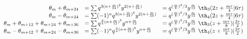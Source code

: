 \begin{equation}
  \begin{array}{rll}
\theta_m + \theta_{m+24} &= \sum q^{3(n+{m\over 24})^2} y^{2(n+{m\over 24})} 
   &= q^{({m\over 8})^2/3} y^{m\over 12} ~\th_3(2z+{m\tau\over 4}|6\tau) \\
\theta_m - \theta_{m+24} &= \sum (-1)^n q^{3(n+{m\over 24})^2} y^{2(n+{m\over 24})} 
   &= q^{({m\over 8})^2/3} y^{m\over 12} ~\th_4(2z+{m\tau\over 4}|6\tau) \\
\theta_m + \theta_{m+12} + \theta_{m+24} + \theta_{m+36} 
&=  \sum q^{{3\over 4}(n+{m\over 12})^2} y^{n+{m\over 12}} 
&= q^{({m\over 8})^2/3} y^{m\over 12} ~\th_3(z+{m\tau\over
  8})|{3\tau\over 2}) \\ 
\theta_m - \theta_{m+12} + \theta_{m+24} - \theta_{m+36} 
&=  \sum (-1)^n q^{{3\over 4}(n+{m\over 12})^2} y^{n+{m\over 12}} 
&= q^{({m\over 8})^2/3} y^{m\over 12} ~\th_4(z+{m\tau\over
  8})|{3\tau\over 2})\\
  \end{array}
\end{equation}

